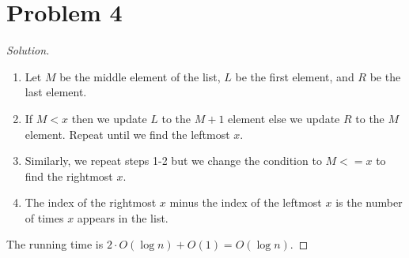 \documentclass[12pt, letterpaper]{article}
\newenvironment{solution}{\begin{proof}[Solution]\hfill\\}{\end{proof}}
\begin{document}
\section{Problem 4}
\begin{solution}
    \begin{enumerate}
        \item Let \(M\) be the middle element of the list, \(L\) be the first element, and \(R\) be the last element.
        \item If \(M<x\) then we update \(L\) to the \(M+1\) element
        else we update \(R\) to the \(M\) element. Repeat until we find the leftmost \(x\).
        \item Similarly, we repeat steps 1-2 but we change the condition to \(M<=x\) to find the rightmost \(x\).
        \item The index of the rightmost \(x\) minus the index of the leftmost \(x\) is the number of times \(x\) appears in the list.
    \end{enumerate}
    The running time is \(2\cdot O(\log n)+O(1)=O(\log n)\).
\end{solution}
\end{document}
